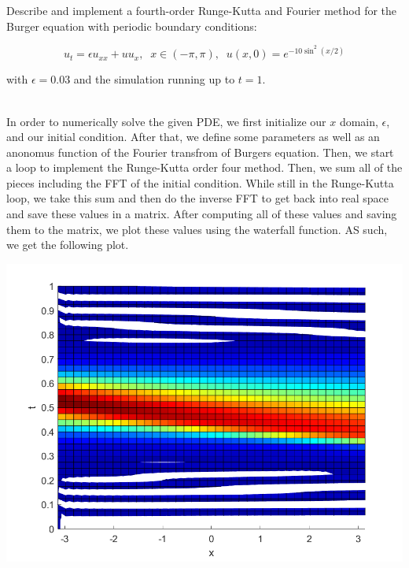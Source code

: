 Describe and implement a fourth-order Runge-Kutta and Fourier method for the Burger equation with
periodic boundary conditions:

$$u_t = \epsilon u_{xx} + uu_x,\;\;x\in(-\pi,\pi),\;\;u(x,0) = e^{-10\sin^2(x/2)}$$

with $\epsilon = 0.03$ and the simulation running up to $t = 1$.

\begin{solution}\renewcommand{\qedsymbol}{}\ \\
    In order to numerically solve the given PDE, we first initialize our $x$ domain, $\epsilon$, and
    our initial condition. After that, we define some parameters as well as an anonomus function of the
    Fourier transfrom of Burgers equation. Then, we start a loop to implement the Runge-Kutta order
    four method. Then, we sum all of the pieces including the FFT of the initial condition. While still
    in the Runge-Kutta loop, we take this sum and then do the inverse FFT to get back into real space
    and save these values in a matrix. After computing all of these values and saving them to the
    matrix, we plot these values using the waterfall function. AS such, we get the following plot.\\

    \begin{center}
        \includegraphics[scale=0.6]{problem1.PNG}
    \end{center}

\end{solution}

\newpage

\newpage